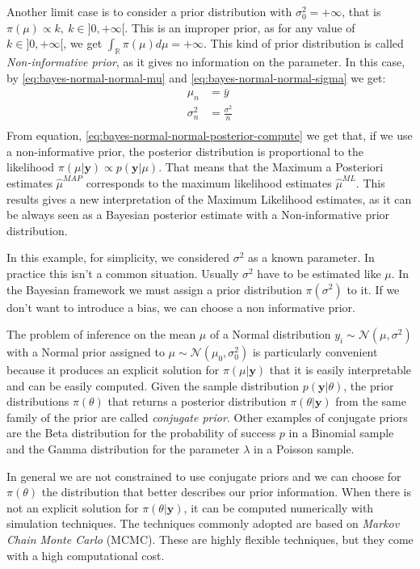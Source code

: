 \documentclass[a4paper, twoside, openright, 12pt]{report}
\theoremstyle{definition}
\theoremstyle{definition}
\theoremstyle{definition}
\theoremstyle{remark}
\begin{document}
Another limit case is to consider a prior distribution with \(\sigma_0^2 = +\infty\), that is \(\pi(\mu)\propto k, \ k\in]0,+\infty[\). This is an improper prior, as for any value of \(k\in]0,+\infty[\), we get \(\int_{\mathbb{R}}{\pi(\mu)d\mu}=+\infty\). This kind of prior distribution is called \emph{Non-informative prior}, as it gives no information on the parameter. In this case, by \eqref{eq:bayes-normal-normal-mu} and \eqref{eq:bayes-normal-normal-sigma} we get:
\begin{align*}
\mu_n & = \bar{y} \\
\sigma_n^2 & = \frac{\sigma^2}{n} \\
\end{align*}
From equation, \eqref{eq:bayes-normal-normal-posterior-compute} we get that, if we use a non-informative prior, the posterior distribution is proportional to the likelihood \(\pi(\mu|\boldsymbol{y}) \propto p(\boldsymbol{y}|\mu)\). That means that the Maximum a Posteriori estimates \(\hat{\mu}^{MAP}\) corresponds to the maximum likelihood estimates \(\hat{\mu}^{ML}\). This results gives a new interpretation of the Maximum Likelihood estimates, as it can be always seen as a Bayesian posterior estimate with a Non-informative prior distribution.

In this example, for simplicity, we considered \(\sigma^2\) as a known parameter. In practice this isn't a common situation. Usually \(\sigma^2\) have to be estimated like \(\mu\). In the Bayesian framework we must assign a prior distribution \(\pi(\sigma^2)\) to it. If we don't want to introduce a bias, we can choose a non informative prior.

The problem of inference on the mean \(\mu\) of a Normal distribution \(y_i\sim\mathcal{N}(\mu, \sigma^2)\) with a Normal prior assigned to \(\mu\sim\mathcal{N}(\mu_0, \sigma_0^2)\) is particularly convenient because it produces an explicit solution for \(\pi(\mu|\boldsymbol{y})\) that it is easily interpretable and can be easily computed. Given the sample distribution \(p(\boldsymbol{y}|\theta)\), the prior distributions \(\pi(\theta)\) that returns a posterior distribution \(\pi(\theta|\boldsymbol{y})\) from the same family of the prior are called \emph{conjugate prior}. Other examples of conjugate priors are the Beta distribution for the probability of success \(p\) in a Binomial sample and the Gamma distribution for the parameter \(\lambda\) in a Poisson sample.

In general we are not constrained to use conjugate priors and we can choose for \(\pi(\theta)\) the distribution that better describes our prior information. When there is not an explicit solution for \(\pi(\theta|\boldsymbol{y})\), it can be computed numerically with simulation techniques. The techniques commonly adopted are based on \emph{Markov Chain Monte Carlo} (MCMC). These are highly flexible techniques, but they come with a high computational cost.
\end{document}
